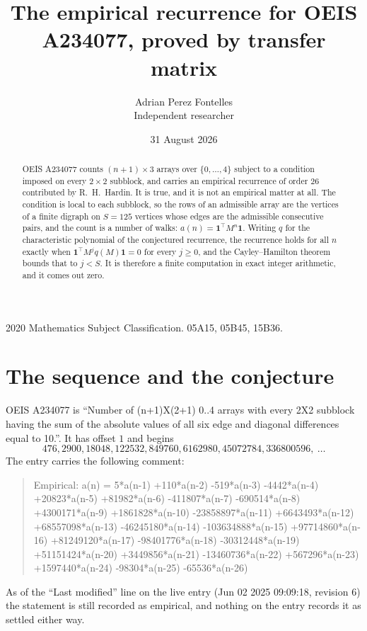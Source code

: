 \documentclass[11pt,a4paper]{article}
\title{The empirical recurrence for OEIS A234077, proved by transfer matrix}
\author{Adrian Perez Fontelles\\ \small Independent researcher}
\date{31 August 2026}
\theoremstyle{plain}
\theoremstyle{definition}
\begin{document}
\maketitle

\begin{abstract}
OEIS A234077 counts $(n+1)\times3$ arrays over $\{0,\dots,4\}$ subject to a condition imposed on
every $2\times2$ subblock, and carries an empirical recurrence of order $26$ contributed
by R.~H.~Hardin. It is true, and it is not an empirical matter at all. The condition is local
to each subblock, so the rows of an admissible array are the vertices of a finite digraph
on $S=125$ vertices whose edges are the admissible consecutive pairs, and the count is a
number of walks: $a(n)=\mathbf{1}^{\!\top}M^{n}\mathbf{1}$. Writing $q$
for the characteristic polynomial of the conjectured recurrence, the recurrence holds for all
$n$ exactly when $\mathbf{1}^{\!\top}M^{j}q(M)\mathbf{1}=0$ for every $j\ge0$, and the
Cayley--Hamilton theorem bounds that to $j<S$. It is therefore a finite computation in exact
integer arithmetic, and it comes out zero.
\end{abstract}

\noindent\small 2020 Mathematics Subject Classification. 05A15, 05B45, 15B36.\normalsize

\section{The sequence and the conjecture}

OEIS A234077 is ``Number of (n+1)X(2+1) 0..4 arrays with every 2X2 subblock having the sum of the absolute values of all six edge and diagonal differences equal to 10.''. It has offset $1$ and begins
\[
476, 2900, 18048, 122532, 849760, 6162980, 45072784, 336800596,\ \dots
\]
The entry carries the following comment:
\begin{quote}\small
Empirical: a(n) = 5*a(n-1) +110*a(n-2) -519*a(n-3) -4442*a(n-4) +20823*a(n-5) +81982*a(n-6) -411807*a(n-7) -690514*a(n-8) +4300171*a(n-9) +1861828*a(n-10) -23858897*a(n-11) +6643493*a(n-12) +68557098*a(n-13) -46245180*a(n-14) -103634888*a(n-15) +97714860*a(n-16) +81249120*a(n-17) -98401776*a(n-18) -30312448*a(n-19) +51151424*a(n-20) +3449856*a(n-21) -13460736*a(n-22) +567296*a(n-23) +1597440*a(n-24) -98304*a(n-25) -65536*a(n-26)
\end{quote}
As of the ``Last modified'' line on the live entry (Jun 02 2025 09:09:18, revision 6) the statement is
still recorded as empirical, and nothing on the entry records it as settled either way.
\end{document}
